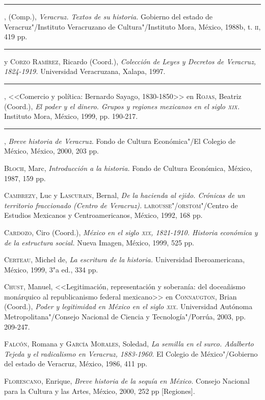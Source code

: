 \documentclass[14pt,twoside,final]{extbook} %
\begin{document}
\rule{1cm}{0.4pt}, (Comp.), \emph{Veracruz. Textos de su historia.} Gobierno del estado de Veracruz"/Instituto Veracruzano de Cultura"/Instituto Mora, México, 1988b, t. \textsc{ii}, 419 pp.

\rule{1cm}{0.4pt} y \textsc{Corzo Ramírez}, Ricardo (Coord.), \emph{Colección de Leyes y Decretos de Veracruz, 1824-1919.} Universidad Veracruzana, Xalapa, 1997.

\rule{1cm}{0.4pt}, <<Comercio y política: Bernardo Sayago, 1830-1850>> en \textsc{Rojas}, Beatriz (Coord.), \emph{El poder y el dinero. Grupos y regiones mexicanos en el siglo \textsc{xix}.} Instituto Mora, México, 1999, pp. 190-217.

\rule{1cm}{0.4pt}, \emph{Breve historia de Veracruz.} Fondo de Cultura Económica"/El Colegio de México, México, 2000, 203 pp.

\textsc{Bloch}, Marc, \emph{Introducción a la historia.} Fondo de Cultura Económica, México, 1987, 159 pp.

\textsc{Cambrezy}, Luc y \textsc{Lascurain}, Bernal, \emph{De la hacienda al ejido. Crónicas de un territorio fraccionado (Centro de Veracruz).} \textsc{larousse"/orstom}"/Centro de Estudios Mexicanos y Centroamericanos, México, 1992, 168 pp.

\textsc{Cardozo}, Ciro (Coord.), \emph{México en el siglo \textsc{xix}, 1821-1910. Historia económica y de la estructura social.} Nueva Imagen, México, 1999, 525 pp.

\textsc{Certeau}, Michel de, \emph{La escritura de la historia.} Universidad Iberoamericana, México, 1999, 3"a ed., 334 pp.

\textsc{Chust}, Manuel, <<Legitimación, representación y soberanía: del doceañismo
monárquico al republicanismo federal mexicano>> en \textsc{Connaugton}, Brian (Coord.), \emph{Poder y legitimidad en México en el siglo \textsc{xix}.} Universidad Autónoma Metropolitana"/Consejo Nacional de Ciencia y Tecnología"/Porrúa, 2003, pp. 209-247.

\textsc{Falcón}, Romana y \textsc{García Morales}, Soledad, \emph{La semilla en el surco. Adalberto Tejeda y el radicalismo en Veracruz, 1883-1960.} El Colegio de México"/Gobierno del
estado de Veracruz, México, 1986, 411 pp.

\textsc{Florescano}, Enrique, \emph{Breve historia de la sequía en México.} Consejo Nacional para la Cultura y las Artes, México, 2000, 252 pp [Regiones].
\end{document}
